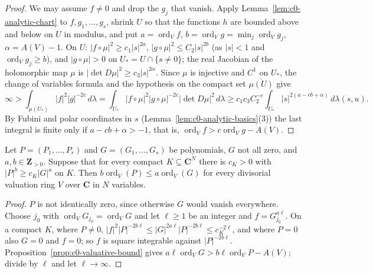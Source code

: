 \begin{proof}
We may assume $f\ne0$ and drop the $g_j$ that vanish. Apply Lemma~\ref{lem:c0-analytic-chart} to $f,g_1,\dots,g_s$, shrink $U$ so that
the functions $h$ are bounded above and below on $U$ in modulus, and put $a=\operatorname{ord}_V f$, $b=\operatorname{ord}_V g=\min_j\operatorname{ord}_V g_j$,
$\alpha=A(V)-1$. On $U$: $|f\circ\mu|^2\ge c_1|s|^{2a}$, $|g\circ\mu|^2\le C_2|s|^{2b}$ (as $|s|<1$ and $\operatorname{ord}_Vg_j\ge b$), and $|g\circ\mu|>0$ on
$U_*=U\cap\{s\ne0\}$; the real Jacobian of the holomorphic map $\mu$ is $|\det D\mu|^2\ge c_3|s|^{2\alpha}$. Since $\mu$ is injective and $C^1$
on $U_*$, the change of variables formula and the hypothesis on the compact set $\overline{\mu(U)}$ give
\[
\infty>\int_{\mu(U_*)}|f|^2|g|^{-2c}\,d\lambda=\int_{U_*}|f\circ\mu|^2|g\circ\mu|^{-2c}|\det D\mu|^2\,d\lambda
\ge c_1c_3C_2^{-c}\int_{U_*}|s|^{2(a-cb+\alpha)}\,d\lambda(s,u).
\]
By Fubini and polar coordinates in $s$ (Lemma~\ref{lem:c0-analytic-basics}(3)) the last integral is finite only if $a-cb+\alpha>-1$,
that is, $\operatorname{ord}_Vf>c\operatorname{ord}_Vg-A(V)$.
\end{proof}

\begin{corollary}\label{cor:c0-valuative-upper}
\leanok
{}
Let $P=(P_1,\dots,P_r)$ and $G=(G_1,\dots,G_s)$ be polynomials, $G$ not all zero, and $a,b\in\mathbf Z_{>0}$. Suppose that for every
compact $K\subseteq\mathbf C^N$ there is $c_K>0$ with $|P|^b\ge c_K|G|^a$ on $K$. Then $b\operatorname{ord}_V(P)\le a\operatorname{ord}_V(G)$ for every divisorial
valuation ring $V$ over $\mathbf C$ in $N$ variables.
\end{corollary}

\begin{proof}
$P$ is not identically zero, since otherwise $G$ would vanish everywhere. Choose $j_0$ with $\operatorname{ord}_VG_{j_0}=\operatorname{ord}_VG$ and let
$\ell\ge1$ be an integer and $f=G_{j_0}^{a\ell}$. On a compact $K$, where $P\ne0$, $|f|^2|P|^{-2b\ell}\le|G|^{2a\ell}|P|^{-2b\ell}\le c_K^{-2\ell}$, and
where $P=0$ also $G=0$ and $f=0$; so $f$ is square integrable against $|P|^{-2b\ell}$. Proposition~\ref{prop:c0-valuative-bound} gives
$a\ell\operatorname{ord}_VG>b\ell\operatorname{ord}_VP-A(V)$; divide by $\ell$ and let $\ell\to\infty$.
\end{proof}

